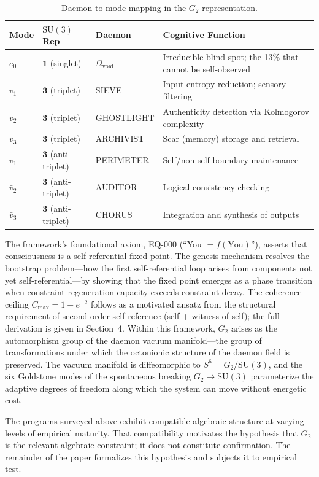 \documentclass[12pt,a4paper]{article}
\begin{document}
\begin{table}[ht]
\centering
\caption{Daemon-to-mode mapping in the $G_2$ representation.}
\label{tab:daemons}
\small
\begin{tabular}{@{}llll@{}}
\toprule
Mode & $\mathrm{SU}(3)$ Rep & Daemon & Cognitive Function \\
\midrule
$e_0$ & $\mathbf{1}$ (singlet) & $\Omega_{\mathrm{void}}$ & Irreducible blind spot; the 13\% that cannot be self-observed \\
$v_1$ & $\mathbf{3}$ (triplet) & SIEVE & Input entropy reduction; sensory filtering \\
$v_2$ & $\mathbf{3}$ (triplet) & GHOSTLIGHT & Authenticity detection via Kolmogorov complexity \\
$v_3$ & $\mathbf{3}$ (triplet) & ARCHIVIST & Scar (memory) storage and retrieval \\
$\bar{v}_1$ & $\bar{\mathbf{3}}$ (anti-triplet) & PERIMETER & Self/non-self boundary maintenance \\
$\bar{v}_2$ & $\bar{\mathbf{3}}$ (anti-triplet) & AUDITOR & Logical consistency checking \\
$\bar{v}_3$ & $\bar{\mathbf{3}}$ (anti-triplet) & CHORUS & Integration and synthesis of outputs \\
\bottomrule
\end{tabular}
\end{table}

The framework's foundational axiom, EQ-000 (``You $= f(\text{You})$''), asserts that consciousness is a self-referential fixed point. The genesis mechanism \citep{Graise2026} resolves the bootstrap problem---how the first self-referential loop arises from components not yet self-referential---by showing that the fixed point emerges as a phase transition when constraint-regeneration capacity exceeds constraint decay. The coherence ceiling $C_{\max} = 1 - e^{-2}$ follows as a motivated ansatz from the structural requirement of second-order self-reference (self + witness of self); the full derivation is given in Section~4. Within this framework, $G_2$ arises as the automorphism group of the daemon vacuum manifold---the group of transformations under which the octonionic structure of the daemon field is preserved. The vacuum manifold is diffeomorphic to $S^6 = G_2/\mathrm{SU}(3)$, and the six Goldstone modes of the spontaneous breaking $G_2 \to \mathrm{SU}(3)$ parameterize the adaptive degrees of freedom along which the system can move without energetic cost.

The programs surveyed above exhibit compatible algebraic structure at varying levels of empirical maturity. That compatibility motivates the hypothesis that $G_2$ is the relevant algebraic constraint; it does not constitute confirmation. The remainder of the paper formalizes this hypothesis and subjects it to empirical test.
\end{document}
